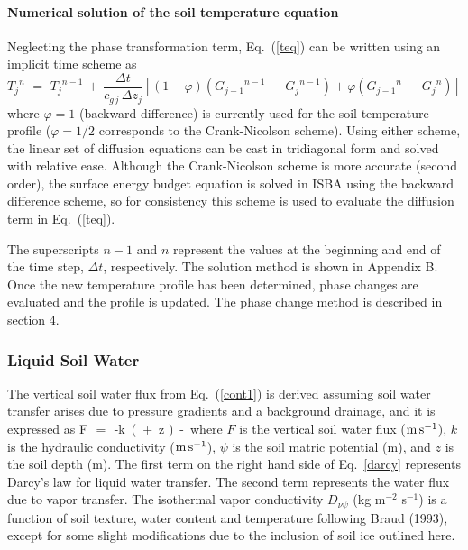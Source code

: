 \paragraph{Numerical solution of the soil temperature equation}
%
Neglecting the phase transformation term,
Eq.~(\ref{teq}) can be written using an implicit time scheme as
%
\begin{equation}\label{teqcn}
{T_j}^{n}\,\,=\,\, {T_j}^{n-1} \,+\, 
\frac{\Delta t }{c_{g\,j}\,\Delta z_j}
\left[
\left(1-\varphi\right)
\left( {G_{j-1}}^{n-1} \,-\, {G_j}^{n-1} \right) +
\varphi
\left( {G_{j-1}}^{n} \,-\, {G_j}^{n} \right)
\right] 
\end{equation}
%
where $\varphi=1$ (backward difference) is currently used
for the soil temperature profile ($\varphi=1/2$ corresponds
to the Crank-Nicolson scheme).
Using either scheme,
the linear set of diffusion equations can be cast in tridiagonal
form and solved with relative ease. Although the Crank-Nicolson
scheme is more accurate (second order), the surface energy budget
equation is solved in ISBA using the backward difference scheme,
so for consistency this scheme is used to evaluate the diffusion term
in Eq.~(\ref{teq}).

The superscripts $n-1$ and $n$ represent the values
at the beginning and end of the time step, $\Delta t$, respectively.
The solution method is shown in Appendix B.
Once the new temperature profile has been determined, phase changes
are evaluated and the profile is updated. The phase change method
is described in section 4.

\subsubsection{Liquid Soil Water}
%
The vertical soil water flux from Eq.~(\ref{cont1}) is 
derived assuming soil water transfer arises due to
pressure gradients and a background drainage, and it is
expressed as
%
\beq\label{darcy}
F \,\,=\,\, -k\,  
\left( \psi \,+\, z \right) 
\,-\, 
\eeq
%
where $F$ is the vertical soil water flux (${\rm m\,s^{-1}}$),
$k$ is the hydraulic conductivity (${\rm m\,s^{-1}}$),
$\psi$ is the soil matric potential (m),
and $z$ is the soil depth (m). 
The first term on the right hand side
of Eq.~\ref{darcy} represents Darcy's law for liquid
water transfer. The second term 
represents the water flux due to vapor transfer.
The isothermal vapor conductivity $D_{\nu\psi}$ 
(kg m$^{-2}$ s$^{-1}$) is a function of soil texture,
water content and temperature following Braud \etal (1993)\nocite{Braud1993-10-01},
except for some slight modifications due to the inclusion of
soil ice outlined here.

